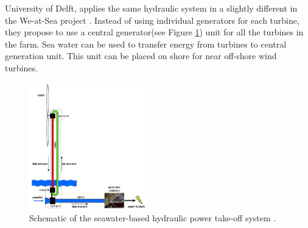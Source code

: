 \documentclass[a4paper, 11pt]{article} %
\begin{document}
University of Delft, applies the same hydraulic system in a slightly different in the We-at-Sea project \cite{Diepeveen2004}. Instead of using individual generators for each turbine, they propose to use a central generator(see Figure \ref{we-at-sea}) unit for all the turbines in the farm. Sea water can be used to transfer energy from turbines to central generation unit. This unit can be placed on shore for near off-shore wind turbines.

  \begin{figure}[t]
    \centering
    \includegraphics[width=0.45\textwidth]{we-at-sea}
    \caption{Schematic of the seawater-based hydraulic power take-off system  \cite{Diepeveen2004}.} 
    \label{we-at-sea}
  \end{figure}







\end{document}
